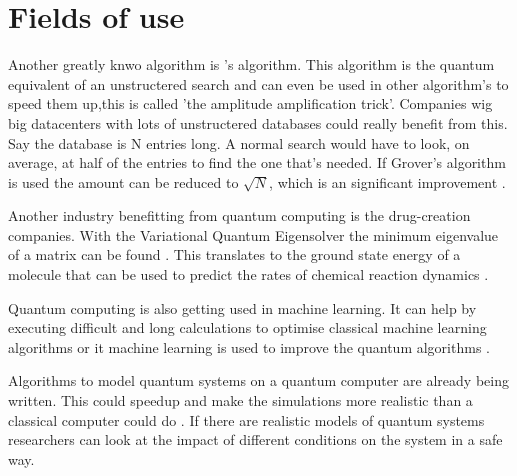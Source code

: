 \section{Fields of use}
\label{sec:Fields of use}
Another greatly knwo algorithm is \textcite{grover}'s algorithm.
This algorithm is the quantum equivalent of an unstructered search and can even be used in other algorithm's to speed them up,this is called 'the amplitude amplification trick'.
Companies wig big datacenters with lots of unstructered databases could really benefit from this. Say the database is N entries long. A normal search would have to look, on average, at half of the entries to find the one that's needed.
If Grover's algorithm is used the amount can be reduced to $\sqrt{N}$, which is an significant improvement \autocite{qiskitgrover}.

Another industry benefitting from quantum computing is the drug-creation companies.
With the Variational Quantum Eigensolver the minimum eigenvalue of a matrix can be found \autocite{simmol}. This translates to the ground state energy of a molecule that can be used to predict the rates of chemical reaction dynamics \autocite{chem}.

Quantum computing is also getting used in machine learning. It can help by executing difficult and long calculations to optimise classical machine learning algorithms or it machine learning is used to improve the quantum algorithms \autocite{qml}.

Algorithms to model quantum systems on a quantum computer are already being written. This could speedup and make the simulations more realistic than a classical computer could do \autocite{simulations}.
If there are realistic models of quantum systems researchers can look at the impact of different conditions on the system in a safe way. 
